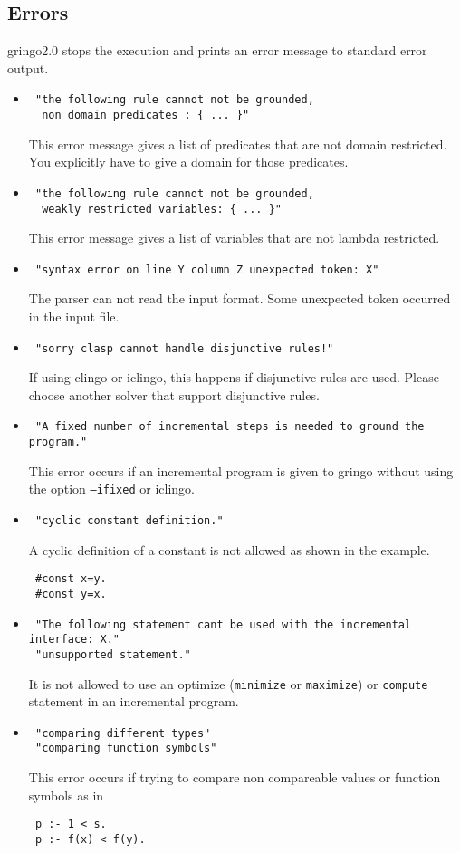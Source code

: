 \documentclass[a4paper,10pt]{article}
\begin{document}
\subsection{Errors}
gringo2.0 stops the execution and prints an error message to standard error output.
\begin{itemize}
 \item 
\begin{verbatim}
 "the following rule cannot not be grounded,
  non domain predicates : { ... }"
\end{verbatim}
This error message gives a list of predicates that are not domain restricted.
You explicitly have to give a domain for those predicates.
 \item 
\begin{verbatim}
 "the following rule cannot not be grounded,
  weakly restricted variables: { ... }"
\end{verbatim}
This error message gives a list of variables that are not lambda restricted. 
\item
\begin{verbatim}
 "syntax error on line Y column Z unexpected token: X"
\end{verbatim}
The parser can not read the input format. Some unexpected token occurred in the input file.
\item
\begin{verbatim}
 "sorry clasp cannot handle disjunctive rules!"
\end{verbatim}
If using clingo or iclingo, this happens if disjunctive rules are used. Please choose another solver that support disjunctive rules.
\item
\begin{verbatim}
 "A fixed number of incremental steps is needed to ground the program."
\end{verbatim}
This error occurs if an incremental program is given to gringo without using the option \texttt{--ifixed} or iclingo.
\item
\begin{verbatim}
 "cyclic constant definition."
\end{verbatim}
A cyclic definition of a constant is not allowed as shown in the example.
\begin{verbatim}
 #const x=y.
 #const y=x.
\end{verbatim}
\item
\begin{verbatim}
 "The following statement cant be used with the incremental interface: X."
 "unsupported statement."
\end{verbatim}
It is not allowed to use an optimize (\texttt{minimize} or \texttt{maximize}) or \texttt{compute} statement in an incremental program.
\item
\begin{verbatim}
 "comparing different types"
 "comparing function symbols"
\end{verbatim}
This error occurs if trying to compare non compareable values or function symbols as in
\begin{verbatim}
 p :- 1 < s.
 p :- f(x) < f(y).
\end{verbatim}


\end{itemize}
\end{document}
